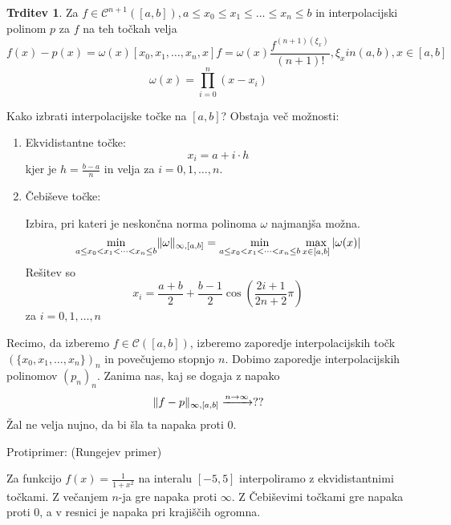 \documentclass[a4paper,12pt]{article}
\DeclarePairedDelimiter\norm{\lVert}{\rVert}
\theoremstyle{definition}
\newtheorem{claim}[counter]{Trditev}
\theoremstyle{remark}
\begin{document}
\begin{claim}
    Za $f \in \mathscr{C}^{n+1}([a, b]), a \leq x_0 \leq x_1 \leq \dots \leq x_n \leq b$ in interpolacijski polinom $p$ za $f$ na teh točkah velja
    \begin{equation*}
        f(x) - p(x) = \omega(x) [x_0, x_1, \dots, x_n, x] f = \omega(x) \frac{f^{(n+1)(\xi_x)}}{(n+1)!}, \xi_x in (a, b), x \in [a, b]
    \end{equation*}
    \begin{equation*}
        \omega(x) = \prod_{i = 0}^{n} (x-x_i)
    \end{equation*}
\end{claim}

Kako izbrati interpolacijske točke na $[a, b]$? Obstaja več možnosti:
\begin{enumerate}
    \item Ekvidistantne točke:
    \begin{equation*}
        x_i = a + i \cdot h
    \end{equation*}
    kjer je $h = \frac{b-a}{n}$ in velja za $i = 0, 1, \dots, n$.

    \item Čebiševe točke:
    
    Izbira, pri kateri je neskončna norma polinoma $\omega$ najmanjša možna.
    \begin{equation*}
        \min_{a \leq x_0 < x_1 < \dots < x_n \leq b} \norm{\omega}_{\infty, [a, b]} = \min_{a \leq x_0 < x_1 < \dots < x_n \leq b} \max_{x \in [a, b]} | \omega(x) |
    \end{equation*}
    Rešitev so
    \begin{equation*}
        x_i = \frac{a+b}{2} + \frac{b-1}{2}\cos(\frac{2i+1}{2n+2}\pi)
    \end{equation*}
    za $i = 0, 1, \dots, n$
\end{enumerate}

Recimo, da izberemo $f \in \mathscr{C}([a, b])$, izberemo zaporedje interpolacijskih točk $(\{x_0, x_1, \dots, x_n\})_n$ in
povečujemo stopnjo $n$. Dobimo zaporedje interpolacijskih polinomov $(p_n)_n$. Zanima nas, kaj se dogaja z napako
\begin{equation*}
    \norm{f-p}_{\infty, [a, b]} \xrightarrow{n \to \infty} ?? 
\end{equation*}
Žal ne velja nujno, da bi šla ta napaka proti 0.

Protiprimer: (Rungejev primer)

Za funkcijo $f(x) = \frac{1}{1+x^2}$ na interalu $[-5, 5]$ interpoliramo z ekvidistantnimi točkami. Z večanjem $n$-ja gre napaka
proti $\infty$. Z Čebiševimi točkami gre napaka proti 0, a v resnici je napaka pri krajiščih ogromna.
\end{document}
